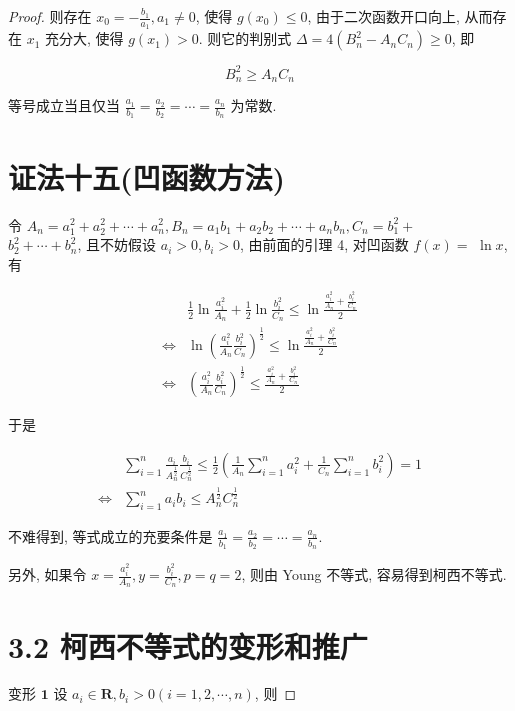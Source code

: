 \begin{proof}
	则存在 $x_{0}=-\frac{b_{1}}{a_{1}}, a_{1} \neq 0$, 使得 $g\left(x_{0}\right) \leqslant 0$, 由于二次函数开口向上, 从而存在 $x_{1}$ 充分大, 使得 $g\left(x_{1}\right)>0$. 则它的判别式 $\Delta=4\left(B_{n}^{2}-A_{n} C_{n}\right) \geqslant 0$, 即
	
	$$
	B_{n}^{2} \geqslant A_{n} C_{n}
	$$
	
	等号成立当且仅当 $\frac{a_{1}}{b_{1}}=\frac{a_{2}}{b_{2}}=\cdots=\frac{a_{n}}{b_{n}}$ 为常数.
	
	\section*{证法十五(凹函数方法)}
	令 $A_{n}=a_{1}^{2}+a_{2}^{2}+\cdots+a_{n}^{2}, B_{n}=a_{1} b_{1}+a_{2} b_{2}+\cdots+a_{n} b_{n}, C_{n}=b_{1}^{2}+$\\
	$b_{2}^{2}+\cdots+b_{n}^{2}$, 且不妨假设 $a_{i}>0, b_{i}>0$, 由前面的引理 4, 对凹函数 $f(x)=$ $\ln x$, 有
	
	$$
	\begin{aligned}
	& \frac{1}{2} \ln \frac{a_{i}^{2}}{A_{n}}+\frac{1}{2} \ln \frac{b_{i}^{2}}{C_{n}} \leqslant \ln \frac{\frac{a_{i}^{2}}{A_{n}}+\frac{b_{i}^{2}}{C_{n}}}{2} \\
	\Leftrightarrow & \ln \left(\frac{a_{i}^{2}}{A_{n}} \frac{b_{i}^{2}}{C_{n}}\right)^{\frac{1}{2}} \leqslant \ln \frac{\frac{a_{i}^{2}}{A_{n}}+\frac{b_{i}^{2}}{C_{n}}}{2} \\
	\Leftrightarrow & \left(\frac{a_{i}^{2}}{A_{n}} \frac{b_{i}^{2}}{C_{n}}\right)^{\frac{1}{2}} \leqslant \frac{\frac{a_{i}^{2}}{A_{n}}+\frac{b_{i}^{2}}{C_{n}}}{2}
	\end{aligned}
	$$
	
	于是
	
	$$
	\begin{aligned}
	& \sum_{i=1}^{n} \frac{a_{i}}{A_{n}^{\frac{1}{2}}} \frac{b_{i}}{C_{n}^{\frac{1}{2}}} \leqslant \frac{1}{2}\left(\frac{1}{A_{n}} \sum_{i=1}^{n} a_{i}^{2}+\frac{1}{C_{n}} \sum_{i=1}^{n} b_{i}^{2}\right)=1 \\
	\Leftrightarrow & \sum_{i=1}^{n} a_{i} b_{i} \leqslant A_{n}^{\frac{1}{2}} C_{n}^{\frac{1}{2}}
	\end{aligned}
	$$
	
	不难得到, 等式成立的充要条件是 $\frac{a_{1}}{b_{1}}=\frac{a_{2}}{b_{2}}=\cdots=\frac{a_{n}}{b_{n}}$.
	
	另外, 如果令 $x=\frac{a_{i}^{2}}{A_{n}}, y=\frac{b_{i}^{2}}{C_{n}}, p=q=2$, 则由 Young 不等式, 容易得到柯西不等式.
	
	\section*{3.2 柯西不等式的变形和推广}
	变形 $\mathbf{1}$ 设 $a_{i} \in \mathbf{R}, b_{i}>0(i=1,2, \cdots, n)$, 则
	

\end{proof}
